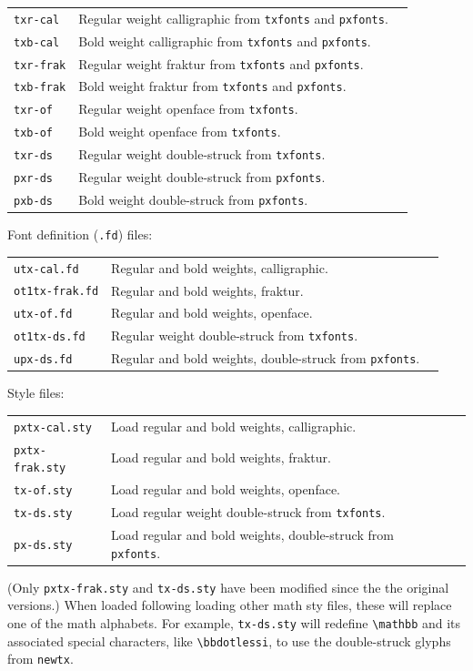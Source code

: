 \documentclass[11pt]{article}
\begin{document}
\begin{tabular}{lll}
{\tt txr-cal}&Regular weight calligraphic from {\tt txfonts} and {\tt pxfonts}.\\
{\tt txb-cal}&Bold weight calligraphic from {\tt txfonts} and {\tt pxfonts}.\\
{\tt txr-frak}&Regular weight fraktur from {\tt txfonts} and {\tt pxfonts}.\\
{\tt txb-frak}&Bold weight fraktur from {\tt txfonts} and {\tt pxfonts}.\\
{\tt txr-of}&Regular weight openface from {\tt txfonts}.\\
{\tt txb-of}&Bold weight openface from {\tt txfonts}.\\
{\tt txr-ds}&Regular weight double-struck from {\tt txfonts}.\\
{\tt pxr-ds}&Regular weight double-struck from {\tt pxfonts}.\\
{\tt pxb-ds}&Bold weight double-struck from {\tt pxfonts}.
\end{tabular}

Font definition ({\tt.fd}) files:

\begin{tabular}{lll}
{\tt utx-cal.fd}&Regular and bold weights, calligraphic.\\
{\tt ot1tx-frak.fd}&Regular and bold weights, fraktur.\\
{\tt utx-of.fd}&Regular and bold weights, openface.\\
{\tt ot1tx-ds.fd}&Regular weight double-struck from {\tt txfonts}.\\
{\tt upx-ds.fd}&Regular and bold weights, double-struck from {\tt pxfonts}.
\end{tabular}

Style files:

\begin{tabular}{lll}
{\tt pxtx-cal.sty}&Load regular and bold weights, calligraphic.\\
{\tt pxtx-frak.sty}&Load regular and bold weights, fraktur.\\
{\tt tx-of.sty}&Load regular and bold weights, openface.\\
{\tt tx-ds.sty}&Load regular weight double-struck from {\tt txfonts}.\\
{\tt px-ds.sty}&Load regular and bold weights, double-struck from {\tt pxfonts}.\\
\end{tabular}
(Only {\tt pxtx-frak.sty} and {\tt tx-ds.sty} have been modified since the the original versions.)
When loaded following loading other math sty files, these will replace one of the math alphabets. For example, {\tt tx-ds.sty} will redefine \verb|\mathbb| and its associated special characters, like \verb|\bbdotlessi|, to use the double-struck glyphs from {\tt newtx}.
 
\end{document}

